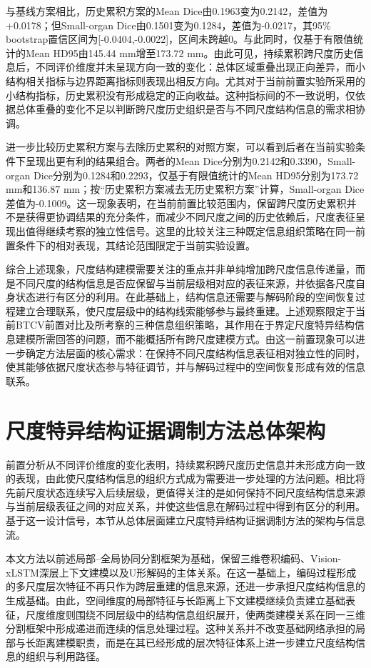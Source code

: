 与基线方案相比，历史累积方案的Mean Dice由0.1963变为0.2142，差值为+0.0178；但Small-organ Dice由0.1501变为0.1284，差值为-0.0217，其95\% bootstrap置信区间为[-0.0404,-0.0022]，区间未跨越0。与此同时，仅基于有限值统计的Mean HD95由145.44 mm增至173.72 mm。由此可见，持续累积跨尺度历史信息后，不同评价维度并未呈现方向一致的变化：总体区域重叠出现正向差异，而小结构相关指标与边界距离指标则表现出相反方向。尤其对于当前前置实验所采用的小结构指标，历史累积没有形成稳定的正向收益。这种指标间的不一致说明，仅依据总体重叠的变化不足以判断跨尺度历史组织是否与不同尺度结构信息的需求相协调。

进一步比较历史累积方案与去除历史累积的对照方案，可以看到后者在当前实验条件下呈现出更有利的结果组合。两者的Mean Dice分别为0.2142和0.3390，Small-organ Dice分别为0.1284和0.2293，仅基于有限值统计的Mean HD95分别为173.72 mm和136.87 mm；按“历史累积方案减去无历史累积方案”计算，Small-organ Dice差值为-0.1009。这一现象表明，在当前前置比较范围内，保留跨尺度历史累积并不是获得更协调结果的充分条件，而减少不同尺度之间的历史依赖后，尺度表征呈现出值得继续考察的独立性信号。这里的比较关注三种既定信息组织策略在同一前置条件下的相对表现，其结论范围限定于当前实验设置。

综合上述现象，尺度结构建模需要关注的重点并非单纯增加跨尺度信息传递量，而是不同尺度的结构信息是否应保留与当前层级相对应的表征来源，并依据各尺度自身状态进行有区分的利用。在此基础上，结构信息还需要与解码阶段的空间恢复过程建立合理联系，使尺度层级中的结构线索能够参与最终重建。上述观察限定于当前BTCV前置对比及所考察的三种信息组织策略，其作用在于界定尺度特异结构信息建模所需回答的问题，而不能概括所有跨尺度建模方式。由这一前置现象可以进一步确定方法层面的核心需求：在保持不同尺度结构信息表征相对独立性的同时，使其能够依据尺度状态参与特征调节，并与解码过程中的空间恢复形成有效的信息联系。

\section{尺度特异结构证据调制方法总体架构}

前置分析从不同评价维度的变化表明，持续累积跨尺度历史信息并未形成方向一致的表现，由此使尺度结构信息的组织方式成为需要进一步处理的方法问题。相比将先前尺度状态连续写入后续层级，更值得关注的是如何保持不同尺度结构信息来源与当前层级表征之间的对应关系，并使这些信息在解码过程中得到有区分的利用。基于这一设计信号，本节从总体层面建立尺度特异结构证据调制方法的架构与信息流。

本文方法以前述局部--全局协同分割框架为基础，保留三维卷积编码、Vision-xLSTM深层上下文建模以及U形解码的主体关系。在这一基础上，编码过程形成的多尺度层次特征不再只作为跨层重建的信息来源，还进一步承担尺度结构信息的生成基础。由此，空间维度的局部特征与长距离上下文建模继续负责建立基础表征，尺度维度则围绕不同层级中的结构信息组织展开，使两类建模关系在同一三维分割框架中形成递进而连续的信息处理过程。这种关系并不改变基础网络承担的局部与长距离建模职责，而是在其已经形成的层次特征体系上进一步建立尺度结构信息的组织与利用路径。

